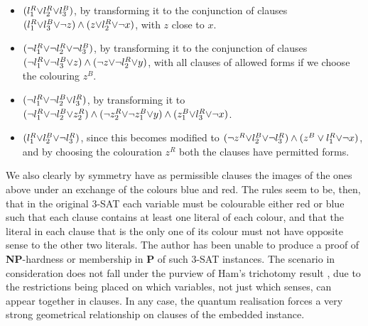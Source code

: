 \documentclass[reprint]{revtex4-1}
\theoremstyle{definition}
\begin{document}
\begin{itemize}
\item $( l_1^R \color{black}{\vee} l_2^R \color{black}{\vee} l_3^B\color{black} )$, by transforming it to the conjunction of clauses $(l_1^R  \color{black}{\vee} l_3^B\color{black}{\vee} \color{black}{\neg z})\wedge(\color{black}{z}\color{black}{\vee} l_2^R\color{black}{\vee} \neg x)$, with $z$ close to $x$.

\item $(\neg l_1^R \color{black}{\vee} \neg l_2^R \color{black}{\vee} \neg l_3^B\color{black} )$, by transforming it to the conjunction of clauses $(\neg l_1^R  \color{black}{\vee} \neg l_3^B\color{black}{\vee} \color{black}{z})\wedge(\color{black}{\neg z}\color{black}{\vee} \neg l_2^R\color{black}{\vee} y)$, with all clauses of allowed forms if we choose the colouring $z^B$.

\item $(\neg l_1^R \color{black}{\vee} \neg l_2^B \color{black}{\vee} l_3^R \color{black})$, by transforming it to 
$(\neg l_1^R  \color{black}{\vee}\neg l_2^B  \color{black}{\vee} z_2^R   \color{black}) \wedge(\neg z_2^R  \color{black}{\vee}  \neg z_1^B \color{black}{\vee}y)    \wedge    (z_1^B \color{black}{\vee} l_3^R  \color{black}{\vee} \neg x)$.

\item $( l_1^R \color{black}{\vee} l_2^B \color{black}{\vee} \neg l_3^R\color{black} )$, since this becomes modified to 
$(\neg z^R \color{black}{\vee}  l_2^B \color{black}{\vee} \neg l_3^R\color{black})\wedge(z^B \vee  l_1^R\color{black}{\vee} \neg x)$, and by choosing the colouration $z^R$ both the clauses have permitted forms.
\end{itemize}
We also clearly by symmetry have as permissible clauses the images of the ones above under an exchange of the colours blue and red. The rules seem to be, then, that in the original \textsc{3-SAT} each variable must be colourable either red or blue such that each clause contains at least one literal of each colour, and that the literal in each clause that is the only one of its colour must not have opposite sense to the other two literals. %
The author has been unable to produce a proof of \textbf{NP}-hardness or membership in \textbf{P} of such \textsc{3-SAT} instances. The scenario in consideration does not fall under the purview of Ham's trichotomy result \cite{Ham2017}, due to the restrictions being placed on which variables, not just which senses, can appear together in clauses. In any case, the quantum realisation forces a very strong geometrical relationship on clauses of the embedded instance.
 
\end{document}
